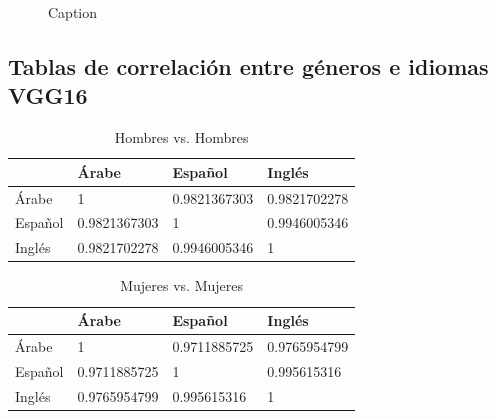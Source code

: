 \documentclass[runningheads]{llncs}
\begin{document}
\begin{figure}
\caption{Caption}
\label{img-resnet-freqs}
\end{figure}




\subsection{Tablas de correlación entre géneros e idiomas VGG16}
\begin{table}[]

\centering
\caption{Hombres vs. Hombres}
\label{male-vs-male-correlation}
\begin{tabular}{|l|l|l|l|}
\hline
        & Árabe        & Español      & Inglés       \\ \hline
Árabe   & 1            & 0.9821367303 & 0.9821702278 \\ \hline
Español & 0.9821367303 & 1            & 0.9946005346 \\ \hline
Inglés  & 0.9821702278 & 0.9946005346 & 1            \\ \hline
\end{tabular}
\end{table}

\begin{table}[]
\centering
\caption{Mujeres vs. Mujeres}
\label{female-vs-female-correlation}
\begin{tabular}{|l|l|l|l|}
\hline
        & Árabe        & Español      & Inglés       \\ \hline
Árabe   & 1            & 0.9711885725 & 0.9765954799 \\ \hline
Español & 0.9711885725 & 1            & 0.995615316  \\ \hline
Inglés  & 0.9765954799 & 0.995615316  & 1            \\ \hline
\end{tabular}
\end{table}
\end{document}
